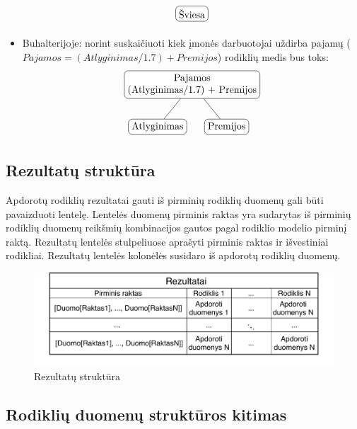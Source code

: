 \documentclass{VUMIFPSbakalaurinis}
\begin{document}
\begin{itemize}
\[\begin{tikzpicture}[sibling distance=7em, every node/.style = {shape=rectangle, rounded                                corners, draw, align=center,	
                                top color=white, bottom color=white}]
            \node{Šviesa};
        \end{tikzpicture} 	
    \]
    \item Buhalterijoje: norint suskaičiuoti kiek įmonės darbuotojai uždirba pajamų (\(\textit{Pajamos} = (\textit{Atlyginimas}/1.7) + \textit{Premijos}\)) rodiklių medis bus toks: 
    \[	
        \begin{tikzpicture}[sibling distance=7em,	
            every node/.style = {shape=rectangle, rounded corners,	
                                 draw, align=center,	
                                 top color=white, bottom color=white}]	
            \node {Pajamos\\(Atlyginimas/1.7) + Premijos}	
                    child { node {Atlyginimas} }	
                    child { node {Premijos} } ;	
        \end{tikzpicture} 	
    \]
\end{itemize}  


\subsection{Rezultatų struktūra}

Apdorotų rodiklių rezultatai gauti iš pirminių rodiklių duomenų gali būti pavaizduoti lentelę. Lentelės duomenų pirminis raktas yra sudarytas iš pirminių rodiklių duomenų reikšmių kombinacijos gautos pagal rodiklio modelio pirminį raktą. Rezultatų lentelės stulpeliuose aprašyti pirminis raktas ir išvestiniai rodikliai. Rezultatų lentelės kolonėlės susidaro iš apdorotų rodiklių duomenų.

\begin{figure}[H]
    \centering
    \includegraphics[width=1\textwidth]{img/rezultatai.pdf}
    \caption{Rezultatų struktūra}
    \label{img:rezultatai}
\end{figure}

\subsection{Rodiklių duomenų struktūros kitimas}
\end{document}
